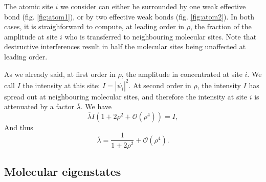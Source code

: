 \documentclass[11pt]{article}
\newcommand{\lb}{\ensuremath{\overline{\lambda}}}
\begin{document}
The atomic site $i$ we consider can either be surrounded by one weak effective bond (fig. \eqref{fig:atom1}), or by two effective weak bonds (fig. \eqref{fig:atom2}).
In both cases, it is straighforward to compute, at leading order in $\rho$, the fraction of the amplitude at site $i$ who is transferred to neighbouring molecular sites.
Note that destructive interferences result in half the molecular sites being unaffected at leading order.

As we already said, at first order in $\rho$, the amplitude in concentrated at site $i$. We call $I$ the intensity at this site: $I=|\psi_i|^2$. 
At second order in $\rho$, the intensity $I$ has spread out at neighbouring molecular sites, and therefore the intensity at site $i$ is attenuated by a factor $\lb$. We have
\begin{equation}
	\lb I ( 1 + 2\rho^2 + \mathcal{O}(\rho^4)) = I,
\end{equation}
And thus
\begin{equation}
	\lb = \frac{1}{1+2 \rho^2} + \mathcal{O}(\rho^4).
\end{equation}

\subsection{Molecular eigenstates}

\newpage

{}

\end{document}
